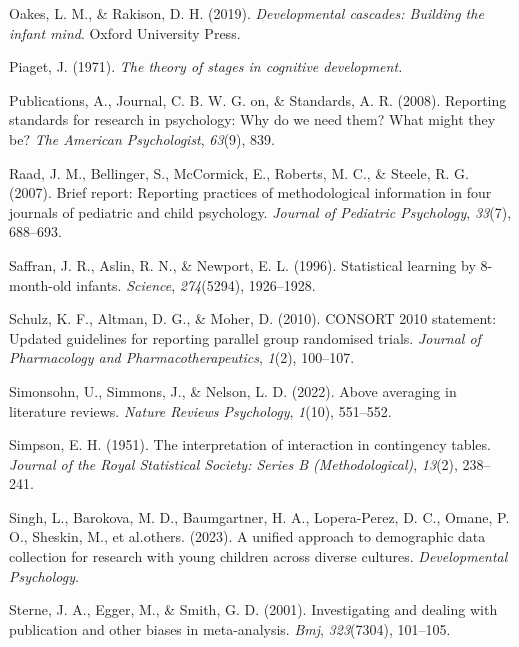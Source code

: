 \documentclass[
  man]{apa6}
\newlength{\cslhangindent}
\newlength{\cslentryspacingunit} %
\newenvironment{CSLReferences}[2] %
 {%
  \setlength{\parindent}{0pt}
  \ifodd #1
  \let\oldpar\par
  \def\par{\hangindent=\cslhangindent\oldpar}
  \fi
  \setlength{\parskip}{#2\cslentryspacingunit}
 }%
 {}
\begin{document}
\begin{CSLReferences}{1}{0}
\leavevmode{}%
Oakes, L. M., \& Rakison, D. H. (2019). \emph{Developmental cascades: Building the infant mind}. Oxford University Press.

\leavevmode{}%
Piaget, J. (1971). \emph{The theory of stages in cognitive development.}

\leavevmode{}%
Publications, A., Journal, C. B. W. G. on, \& Standards, A. R. (2008). Reporting standards for research in psychology: Why do we need them? What might they be? \emph{The American Psychologist}, \emph{63}(9), 839.

\leavevmode{}%
Raad, J. M., Bellinger, S., McCormick, E., Roberts, M. C., \& Steele, R. G. (2007). Brief report: Reporting practices of methodological information in four journals of pediatric and child psychology. \emph{Journal of Pediatric Psychology}, \emph{33}(7), 688--693.

\leavevmode{}%
Saffran, J. R., Aslin, R. N., \& Newport, E. L. (1996). Statistical learning by 8-month-old infants. \emph{Science}, \emph{274}(5294), 1926--1928.

\leavevmode{}%
Schulz, K. F., Altman, D. G., \& Moher, D. (2010). CONSORT 2010 statement: Updated guidelines for reporting parallel group randomised trials. \emph{Journal of Pharmacology and Pharmacotherapeutics}, \emph{1}(2), 100--107.

\leavevmode{}%
Simonsohn, U., Simmons, J., \& Nelson, L. D. (2022). Above averaging in literature reviews. \emph{Nature Reviews Psychology}, \emph{1}(10), 551--552.

\leavevmode{}%
Simpson, E. H. (1951). The interpretation of interaction in contingency tables. \emph{Journal of the Royal Statistical Society: Series B (Methodological)}, \emph{13}(2), 238--241.

\leavevmode{}%
Singh, L., Barokova, M. D., Baumgartner, H. A., Lopera-Perez, D. C., Omane, P. O., Sheskin, M., et al.others. (2023). A unified approach to demographic data collection for research with young children across diverse cultures. \emph{Developmental Psychology}.

\leavevmode{}%
Sterne, J. A., Egger, M., \& Smith, G. D. (2001). Investigating and dealing with publication and other biases in meta-analysis. \emph{Bmj}, \emph{323}(7304), 101--105.


\end{CSLReferences}
\end{document}
